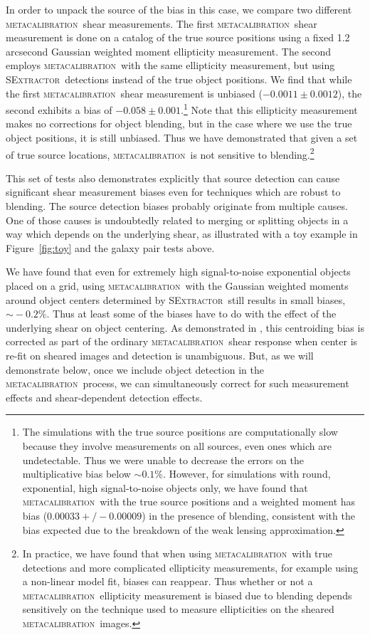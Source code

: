 \documentclass[fleqn,useAMS,usenatbib]{mnras}
\newcommand{\mcal}{\textsc{metacalibration}}
\newcommand{\sx}{\textsc{SExtractor}}
\begin{document}
In order to unpack the source of the bias in this case, we compare two different
\mcal\ shear measurements. The first \mcal\ shear measurement is done on a
catalog of the true source positions using a fixed 1.2 arcsecond Gaussian weighted
moment ellipticity measurement. The second employs \mcal\ with the same ellipticity
measurement, but using \sx\ detections instead of the true object positions. We
find that while the first \mcal\ shear measurement is unbiased
($-0.0011\pm0.0012$), the second exhibits a bias of
$-0.058\pm0.001$.\footnote{The simulations with the true source positions are
computationally slow because they involve measurements on all sources, even ones
which are undetectable. Thus we were unable to decrease the errors on the
multiplicative bias below $\sim0.1\%$. However, for simulations with round,
exponential, high signal-to-noise objects only, we have found that \mcal\ with
the true source positions and a weighted moment has bias
($0.00033 +/- 0.00009$) in the presence of blending, consistent with
the bias expected due to the breakdown of the weak lensing approximation.} Note that this ellipticity
measurement makes no corrections for object blending, but in the case where we
use the true object positions, it is still unbiased. Thus we have demonstrated
that given a set of true source locations, \mcal\ is not sensitive to
blending.\footnote{In practice, we have found that when using \mcal\ with true
detections and more complicated ellipticity measurements, for example using
a non-linear model fit, biases can reappear. Thus
whether or not a \mcal\ ellipticity measurement is biased due to blending depends
sensitively on the technique used to measure ellipticities on the sheared
\mcal\ images.}

This set of tests also demonstrates explicitly that source detection can cause
significant shear measurement biases even for techniques which are robust to
blending. The source detection biases probably originate from multiple causes.
One of those causes is undoubtedly related to merging or splitting objects in a
way which depends on the underlying shear, as illustrated with a toy example in
Figure~\ref{fig:toy} and the galaxy pair tests above.

We have found that even for extremely high signal-to-noise exponential objects
placed on a grid, using \mcal\ with the Gaussian weighted moments around object
centers determined by \sx\ still results in small biases, $\sim\!-0.2\%$. Thus
at least some of the biases have to do with the effect of the underlying shear
on object centering.  As demonstrated in \cite{SheldonMcal2017}, this
centroiding bias is corrected as part of the ordinary \mcal\ shear response
when center is re-fit on sheared images and detection is unambiguous.  But, as
we will demonstrate below, once we include object detection in the \mcal\
process, we can simultaneously correct for such measurement effects and
shear-dependent detection effects.
\end{document}
